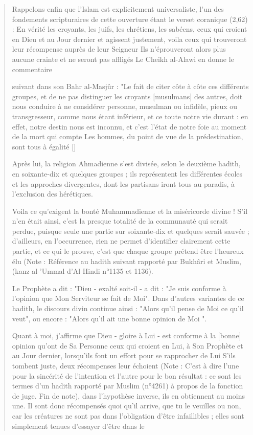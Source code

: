 \begin{quote}
Rappelons enfin que l'Islam est explicitement universaliste, l'un des
fondements scripturaires de cette ouverture étant le verset coranique
(2,62) : En vérité les croyants, les juifs, les chrétiens, les sabéens,
ceux qui croient en Dieu et au Jour dernier et agissent justement, voila
ceux qui trouveront leur récompense auprès de leur Seigneur Ils
n'éprouveront alors plus aucune crainte et ne seront pas affligés Le
Cheikh al-Alawi en donne le commentaire

suivant dans son Bahr al-Masjûr : "Le fait de citer côte à côte ces
différents groupes, et de ne pas distinguer les croyants {[}musulmans{]}
des autres, doit nous conduire à ne considérer personne, musulman ou
infidèle, pieux ou transgresseur, comme nous étant inférieur, et ce
toute notre vie durant : en effet, notre destin nous est inconnu, et
c'est l'état de notre foie au moment de la mort qui compte Les hommes,
du point de vue de la prédestination, sont tous à égalité {[}{]}

Après lui, la religion Ahmadienne s'est divisée, selon le deuxième
hadith, en soixante-dix et quelques groupes ; ils représentent les
différentes écoles et les approches divergentes, dont les partisans
iront tous au paradis, à l'exclusion des hérétiques.

Voila ce qu'exigent la bonté Muhammadienne et la miséricorde divine !
S'il n'en était ainsi, c'est la presque totalité de la communauté qui
serait perdue, puisque seule une partie sur soixante-dix et quelques
serait sauvée ; d'ailleurs, en l'occurrence, rien ne permet d'identifier
clairement cette partie, et ce qui le prouve, c'est que chaque groupe
prétend être l'heureux élu (Note : Référence au hadith suivant rapporté
par Bukhâri et Muslim, (kanz al-'Ummal d'Al Hindi n°1135 et 1136).

Le Prophète a dit : "Dieu - exalté soit-il - a dit : "Je suis conforme à
l'opinion que Mon Serviteur se fait de Moi". Dans d'autres variantes de
ce hadith, le discours divin continue ainsi : "Alors qu'il pense de Moi
ce qu'il veut", ou encore : "Alors qu'il ait une bonne opinion de Moi ".

Quant à moi, j'affirme que Dieu - gloire à Lui - est conforme à la
{[}bonne{]} opinion qu'ont de Sa Personne ceux qui croient en Lui, à Son
Prophète et au Jour dernier, lorsqu'ils font un effort pour se
rapprocher de Lui S'ils tombent juste, deux récompenses leur échoient
(Note : C'est à dire l'une pour la sincérité de l'intention et l'autre
pour le bon résultat : ce sont les termes d'un hadith rapporté par
Muslim (n°4261) à propos de la fonction de juge. Fin de note), dans
l'hypothèse inverse, ils en obtiennent au moins une. Il sont donc
récompensés quoi qu'il arrive, que tu le veuilles ou non, car les
créatures ne sont pas dans l'obligation d'être infaillibles ; elles sont
simplement tenues d'essayer d'être dans le


\end{quote}
